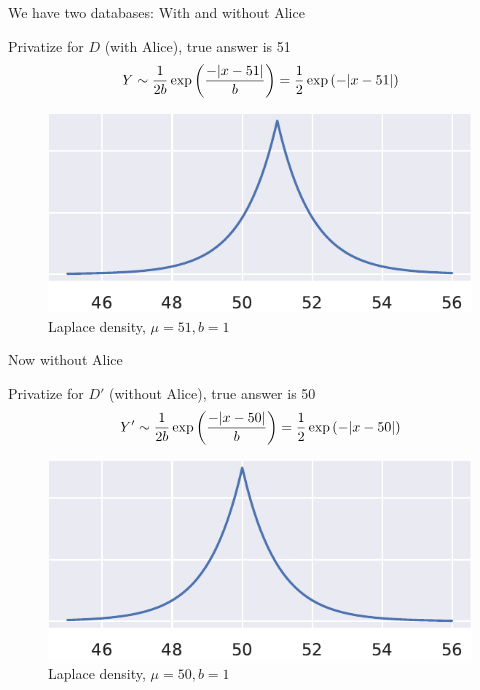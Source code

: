\documentclass[12pt,aspectratio=169,handout]{beamer}
\begin{document}
\begin{frame}{We have two databases: With and without Alice}

Privatize for $D$ (with Alice), true answer is 51
$$
Y \sim \frac{1}{2b} \exp \left( \frac{-\abs{x - 51}}{b} \right) = \frac{1}{2} \exp \left( -\abs{x - 51} \right) 
$$

\begin{figure}
\centering
\includegraphics[width=0.7\linewidth]{img/laplace-density1.pdf}
\caption{Laplace density, $\mu = 51, b = 1$}
\end{figure}

\end{frame}



\begin{frame}{Now without Alice}


Privatize for $D'$ (without Alice), true answer is 50
$$
Y' \sim \frac{1}{2b} \exp \left( \frac{-\abs{x - 50}}{b} \right) = \frac{1}{2} \exp \left( -\abs{x - 50} \right) 
$$


\begin{figure}
\centering
\includegraphics[width=0.7\linewidth]{img/laplace-density2.pdf}
\caption{Laplace density, $\mu = 50, b = 1$}
\end{figure}

\end{frame}
\end{document}
